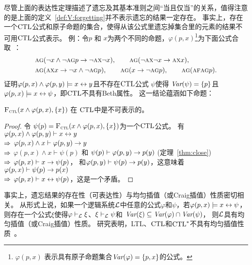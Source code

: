 尽管上面的表达性定理描述了遗忘及其基本准则之间“当且仅当”的关系，值得注意的是上面的定义~\ref{def:V:forgetting}并不表示遗忘的结果一定存在。
事实上，存在一个$\textrm{CTL}$公式和原子命题的集合，使得从该公式里遗忘掉集合里的元素的结果不可用$\textrm{CTL}$公式表示。
例：令$p$ 和 $x$为两个不同的命题，$\varphi(p,x)$\footnote{$\varphi(p,x)$ 表示具有原子命题集合$\textit{Var}(\varphi)=\{p,x\}$的公式。}为下面公式合取~\cite{Maksimova:JANCL:1991}：
\begin{align*}
	&\textsc{a}\textsc{g}(\neg x \wedge \neg \textsc{a} \textsc{g} p \rightarrow \neg \textsc{a} \textsc{x} \neg x),
	\qquad \textsc{a}\textsc{g}(\neg \textsc{a}\textsc{x} \neg x \rightarrow \textsc{a} \textsc{x} x),\\
	& \textsc{a}\textsc{g}(\textsc{a}\textsc{x} x \rightarrow \neg x \wedge \neg \textsc{a} \textsc{g} p),
	\qquad \textsc{a}\textsc{g}(x \rightarrow \neg \textsc{a}\textsc{g} p),
	\qquad \textsc{a}\textsc{g}(\textsc{a} \textsc{f} \textsc{a} \textsc{g} p).
\end{align*}
\citeauthor{Maksimova:JANCL:1991}证明$\varphi(p,x)\land \varphi(p,y)\models x\leftrightarrow y$且不存在$\textrm{CTL}$公式 $\psi$使得 $\textit{Var}(\psi)=\{p\}$且$\varphi(p,x)\models x\leftrightarrow \psi$，即$\textrm{CTL}$不具有Beth属性。
这一结论蕴涵如下命题：
\begin{proposition}\label{pro:uniforget}
${\textsc{F}_{\textsc{ctl}}}(x\land \varphi(p,x), \{x\})$ 在 $\textrm{CTL}$中是不可表示的。
\end{proposition}
\begin{proof}
令 $\psi(p)={\textsc{F}_{\textsc{ctl}}}(x\land \varphi(p,x), \{x\})$为一个$\textrm{CTL}$公式。
有 \\
$\varphi(p,x)\land \varphi(p,y)\vdash x\leftrightarrow y$\\
$\Rightarrow$ $\varphi(p,x)\land x \vdash \varphi(p,y)\rightarrow y$\\
$\Rightarrow$ $\varphi(p,x)\land x\vdash \psi(p)$ 和 $\psi(p)\vdash \varphi(p,y)\rightarrow p(y)$ (定理~\ref{thm:close})\\
$\Rightarrow$ $\varphi(p,x)\vdash x\rightarrow\psi(p)$， 和$\varphi(p,y)\vdash \psi(p)\rightarrow p(y)$，这意味着 $\varphi(p,x)\vdash \psi(p)\rightarrow p(x)$\\
$\Rightarrow$ $\varphi(p,x)\vdash x\leftrightarrow \psi(p)$，这是一个矛盾。
\end{proof}

事实上，遗忘结果的存在性（可表达性）与均匀插值（或Craig插值）性质密切相关。
从形式上说，如果一个逻辑系统${\cal L}$中任意的公式$\varphi$和$\psi$，若$\varphi(p,x)\models x\leftrightarrow \psi$，则存在一个公式$\xi$使得$\varphi\vdash_{\cal L}\xi$、$\xi\vdash_{\cal L}\psi$和 $\textit{Var}(\xi)\subseteq \textit{Var}(\varphi)\cap \textit{Var}(\psi)$，
则${\cal L}$具有均匀插值（或Craig插值）性质。
研究表明，LTL、$\textrm{CTL}$和$\textrm{CTL}^*$不具有均匀插值性质~\cite{Maksimova:JANCL:1991,DAgostino:synthese:2008}。


